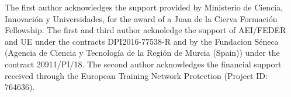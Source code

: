 The first author acknowledges 
the support provided by Ministerio de Ciencia, Innovaci\'on y 
Universidades, for the award of a Juan de la Cierva Formaci\'on
Fellowship. The first and third author acknoledge the support of
AEI/FEDER and UE under the contracts DPI2016-77538-R and by the
Fundacion S\'eneca (Agencia de Ciencia y Tecnolog\'ia de la Regi\'on de 
Murcia (Spain)) under the contract 20911/PI/18. The second author acknowledges the financial support received through the European Training Network Protection (Project ID: 764636).
